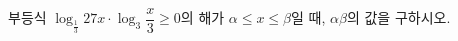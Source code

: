 부등식 $\log_{\frac{1}{3}}27x\cdot\log_3\dfrac{x}{3}\ge 0$의 해가 $\alpha\le x\le\beta$일 때, $\alpha\beta$의 값을 구하시오.
